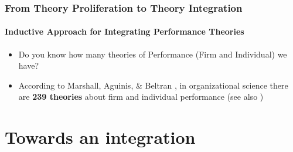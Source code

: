 \documentclass{beamer}
\begin{document}
\begin{frame}
	\frametitle{From Theory Proliferation to Theory Integration}
	\framesubtitle{Inductive Approach for Integrating Performance Theories}
	\begin{itemize}
		\item<1-2> Do you know how many theories of Performance (Firm and Individual) we have?
		\item<2> According to Marshall, Aguinis, \& Beltran \parencite*{marshall2024theories_performance}, in organizational science there are \textbf{239 theories} about firm and individual performance (see also \cite{aguinis2024performance})
	\end{itemize}
\end{frame}




\section{Towards an integration}
\end{document}
